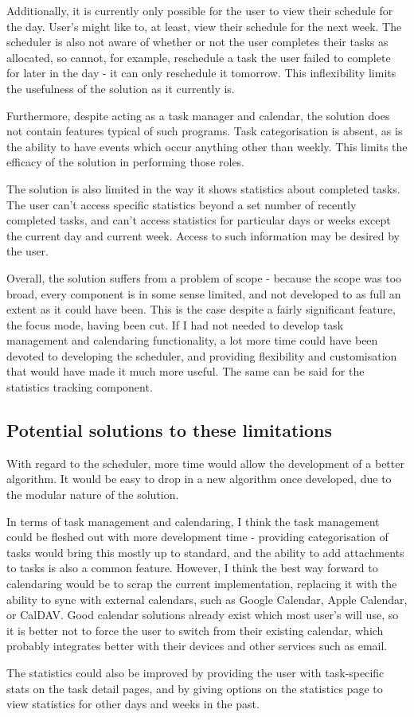 \documentclass{article}
\begin{document}
Additionally,
it is currently only possible for the user to view their schedule for the day.
User's might like to, at least, view their schedule for the next week.
The scheduler is also not aware of whether or not the user completes their tasks as allocated,
so cannot,
for example,
reschedule a task the user failed to complete for later in the day -
it can only reschedule it tomorrow.
This inflexibility limits the usefulness of the solution as it currently is.

Furthermore,
despite acting as a task manager and calendar,
the solution does not contain features typical of such programs.
Task categorisation is absent,
as is the ability to have events which occur anything other than weekly.
This limits the efficacy of the solution in performing those roles.

The solution is also limited in the way it shows statistics about completed tasks.
The user can't access specific statistics beyond a set number of recently completed tasks,
and can't access statistics for particular days or weeks except the current day and current week.
Access to such information may be desired by the user.

Overall,
the solution suffers from a problem of scope -
because the scope was too broad,
every component is in some sense limited,
and not developed to as full an extent as it could have been.
This is the case despite a fairly significant feature,
the focus mode,
having been cut.
If I had not needed to develop task management and calendaring functionality,
a lot more time could have been devoted to developing the scheduler,
and providing flexibility and customisation that would have made it much more useful.
The same can be said for the statistics tracking component.

\subsection{Potential solutions to these limitations}
With regard to the scheduler,
more time would allow the development of a better algorithm.
It would be easy to drop in a new algorithm once developed,
due to the modular nature of the solution.

In terms of task management and calendaring,
I think the task management could be fleshed out with more development time -
providing categorisation of tasks would bring this mostly up to standard,
and the ability to add attachments to tasks is also a common feature.
However,
I think the best way forward to calendaring would be to scrap the current implementation,
replacing it with the ability to sync with external calendars,
such as Google Calendar,
Apple Calendar,
or CalDAV.
Good calendar solutions already exist which most user's will use,
so it is better not to force the user to switch from their existing calendar,
which probably integrates better with their devices and other services such as email.

The statistics could also be improved by providing the user with task-specific stats on the task detail pages,
and by giving options on the statistics page to view statistics for other days and weeks in the past.
\end{document}
